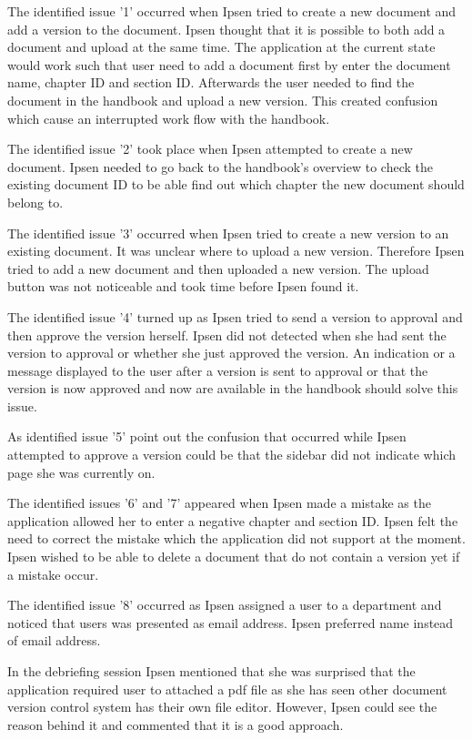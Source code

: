 The identified issue '1' occurred when Ipsen tried to create a new document and add a version to the document. 
Ipsen thought that it is possible to both add a document and upload at the same time. 
The application at the current state would work such that user need to add a document first by enter the document name, chapter ID and section ID. Afterwards the user needed to find the document in the handbook and upload a new version. 
This created confusion which cause an interrupted work flow with the handbook.

The identified issue '2' took place when Ipsen attempted to create a new document. 
Ipsen needed to go back to the handbook's overview to check the existing document ID to be able find out which chapter the new document should belong to. 

The identified issue '3' occurred when Ipsen tried to create a new version to an existing document. 
It was unclear where to upload a new version. 
Therefore Ipsen tried to add a new document and then uploaded a new version. 
The upload button was not noticeable and took time before Ipsen found it. 

The identified issue '4' turned up as Ipsen tried to send a version to approval and then  approve the version herself.
Ipsen did not detected when she had sent the version to approval or whether she just approved the version. 
An indication or a message displayed to the user after a version is sent to approval or that the version is now approved and now are available in the handbook should solve this issue.

As identified issue '5' point out the confusion that occurred while Ipsen attempted to approve a version could be that the sidebar did not indicate which page she was currently on. 

The identified issues '6' and '7' appeared when Ipsen made a mistake as the application allowed her to enter a negative chapter and section ID. 
Ipsen felt the need to correct the mistake which the application did not support at the moment.
Ipsen wished to be able to delete a document that do not contain a version yet if a mistake occur.

The identified issue '8' occurred as Ipsen assigned a user to a department and noticed that users was presented as email address.
Ipsen preferred name instead of email address.

In the debriefing session Ipsen mentioned that she was surprised that the application required user to attached a pdf file as she has seen other document version control system has their own file editor.
However, Ipsen could see the reason behind it and commented that it is a good approach.

